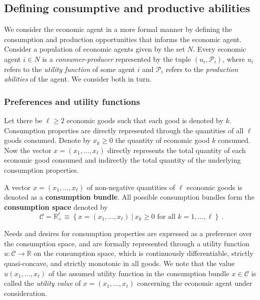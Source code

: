 \subsection{Defining consumptive and productive abilities}

We consider the economic agent in a more formal manner by defining the consumption and production opportunities that informs the economic agent. Consider a population of economic agents given by the set $N$. Every economic agent $i \in N$ is a \emph{consumer-producer} represented by the tuple $\left( u_{i}, \mathcal{P}_{i} \right)$, where $u_{i}$ refers to the \emph{utility function} of some agent $i$ and $\mathcal{P}_{i}$ refers to the \emph{production abilities} of the agent. We consider both in turn.

\subsubsection{Preferences and utility functions}

Let there be $\ell \geqslant 2$ economic goods such that each good is denoted by $k$. Consumption properties are directly represented through the quantities of all $\ell$ goods consumed. Denote by $x_{k} \geqslant 0$ the quantity of economic good $k$ consumed. Now the vector $x = \left( x_{1}, \ldots, x_{\ell} \right)$ directly represents the total quantity of each economic good consumed and indirectly the total quantity of the underlying consumption properties.
\begin{definition}
A vector $x = \left( x_{1}, \ldots, x_{\ell} \right)$ of non-negative quantities of $\ell$ economic goods is denoted as a \textbf{consumption bundle}. All possible consumption bundles form the \textbf{consumption space} denoted by
\begin{equation}
\mathcal{C} = \mathbb{R}_{+}^{\ell} \equiv \left\{ x = \left( x_{1}, \ldots, x_{\ell} \right) ~ | ~ x_{k} \geqslant 0 \mbox{ for all } k = 1, \ldots, \ell \right\} ~ .
\end{equation}
\end{definition}
Needs and desires for consumption properties are expressed as a preference over the consumption space, and are formally represented through a utility function $u \colon \mathcal{C} \rightarrow \mathbb{R}$ on the consumption space, which is continuously differentiable, strictly quasi-concave, and strictly monotonic in all goods. We note that the value $u \left( x_{1}, \ldots , x_{\ell} \right)$ of the assumed utility function in the consumption bundle $x \in \mathcal{C}$ is called the \emph{utility value} of $x = \left( x_{1}, \ldots , x_{\ell} \right)$ concerning the economic agent under consideration.

